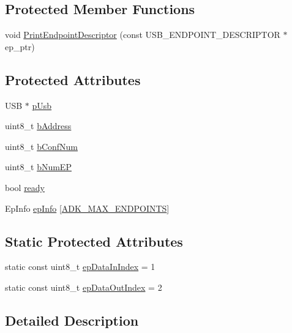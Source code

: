 \subsection*{\-Protected \-Member \-Functions}
\begin{DoxyCompactItemize}
\item 
void \hyperlink{class_a_d_k_ac4bd3303b99921289c3f59e2df219e50}{\-Print\-Endpoint\-Descriptor} (const \-U\-S\-B\-\_\-\-E\-N\-D\-P\-O\-I\-N\-T\-\_\-\-D\-E\-S\-C\-R\-I\-P\-T\-O\-R $\ast$ep\-\_\-ptr)
\end{DoxyCompactItemize}
\subsection*{\-Protected \-Attributes}
\begin{DoxyCompactItemize}
\item 
\-U\-S\-B $\ast$ \hyperlink{class_a_d_k_ab28e3a19569c27f3ed5362e9800065c1}{p\-Usb}
\item 
uint8\-\_\-t \hyperlink{class_a_d_k_ab22a7c60cec56823727d4ff2cf2c4edf}{b\-Address}
\item 
uint8\-\_\-t \hyperlink{class_a_d_k_ae8fcc6a6fccab61116cea10dd1f17738}{b\-Conf\-Num}
\item 
uint8\-\_\-t \hyperlink{class_a_d_k_adf969d306da15baecd5c59bbb568053e}{b\-Num\-E\-P}
\item 
bool \hyperlink{class_a_d_k_a135db75b9e8cdd59b89f46c44dd83dd4}{ready}
\item 
\-Ep\-Info \hyperlink{class_a_d_k_a6ffc693d731ddeb9499c11e893fc467d}{ep\-Info} \mbox{[}\hyperlink{adk_8h_ac39da606ffc273bd855152107297d6a1}{\-A\-D\-K\-\_\-\-M\-A\-X\-\_\-\-E\-N\-D\-P\-O\-I\-N\-T\-S}\mbox{]}
\end{DoxyCompactItemize}
\subsection*{\-Static \-Protected \-Attributes}
\begin{DoxyCompactItemize}
\item 
static const uint8\-\_\-t \hyperlink{class_a_d_k_a964ec80ac133bf8d65cf0274e37b29da}{ep\-Data\-In\-Index} = 1
\item 
static const uint8\-\_\-t \hyperlink{class_a_d_k_acfc5a7e45f15bba7ff8cd42552796624}{ep\-Data\-Out\-Index} = 2
\end{DoxyCompactItemize}


\subsection{\-Detailed \-Description}


